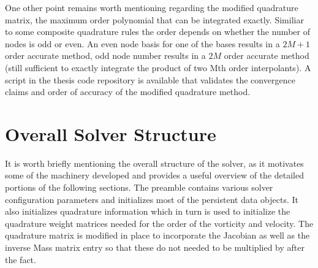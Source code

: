 \documentclass[letterpaper,12pt]{report}
\begin{document}
One other point remains worth mentioning regarding the modified quadrature matrix, the maximum order polynomial that can be integrated exactly. Similiar to some composite quadrature rules the order depends on whether the number of nodes is odd or even. An even node basis for one of the bases results in a $2M+1$ order accurate method, odd node number results in a $2M$ order accurate method (still sufficient to exactly integrate the product of two Mth order interpolants). A script in the thesis code repository is available that validates the convergence claims and order of accuracy of the modified quadrature method.
%
\section{Overall Solver Structure}
It is worth briefly mentioning the overall structure of the solver, as it motivates some of the machinery developed and provides a useful overview of the detailed portions of the following sections. The preamble contains various solver configuration parameters and initializes most of the persistent data objects. It also initializes quadrature information which in turn is used to initialize the quadrature weight matrices needed for the order of the vorticity and velocity. The quadrature matrix is modified in place to incorporate the Jacobian as well as the inverse Mass matrix entry so that these do not needed to be multiplied by after the fact.
\end{document}
